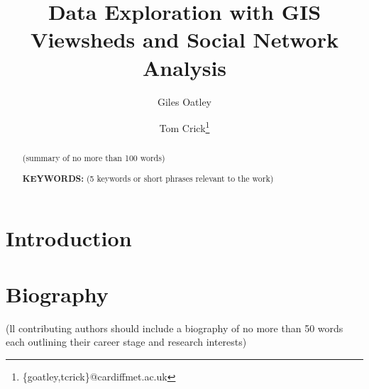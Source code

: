 \documentclass[11pt]{article}
\title{Data Exploration with GIS Viewsheds and Social Network Analysis}
\author{Giles Oatley}
\author{Tom Crick\thanks{\{goatley,tcrick\}@cardiffmet.ac.uk}}
\affil{Department of Computing, Cardiff Metropolitan University}
\date{ }
\begin{document}
\maketitle

\begin{abstract}
\centering

(summary of no more than 100 words)

$ $ \\ {\bf KEYWORDS:} (5 keywords or short phrases relevant to the work)

\end{abstract}


\section{Introduction}

\section*{Biography}
(ll contributing authors should include a biography of no more than 50 words each outlining their career stage and research interests)




\end{document}
